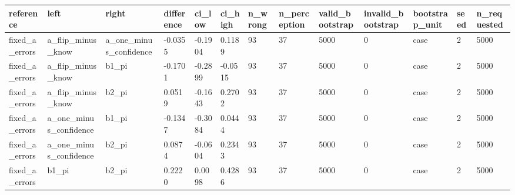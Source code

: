 \begin{tabular}{lllllllllllll}
\hline
reference & left & right & difference & ci\_low & ci\_high & n\_wrong & n\_perception & valid\_bootstrap & invalid\_bootstrap & bootstrap\_unit & seed & n\_requested \\
\hline
fixed\_a\_errors & a\_flip\_minus\_know & a\_one\_minus\_confidence & -0.0355 & -0.1904 & 0.1189 & 93 & 37 & 5000 & 0 & case & 2 & 5000 \\
fixed\_a\_errors & a\_flip\_minus\_know & b1\_pi & -0.1701 & -0.2899 & -0.0515 & 93 & 37 & 5000 & 0 & case & 2 & 5000 \\
fixed\_a\_errors & a\_flip\_minus\_know & b2\_pi & 0.0519 & -0.1643 & 0.2702 & 93 & 37 & 5000 & 0 & case & 2 & 5000 \\
fixed\_a\_errors & a\_one\_minus\_confidence & b1\_pi & -0.1347 & -0.3084 & 0.0444 & 93 & 37 & 5000 & 0 & case & 2 & 5000 \\
fixed\_a\_errors & a\_one\_minus\_confidence & b2\_pi & 0.0874 & -0.0604 & 0.2343 & 93 & 37 & 5000 & 0 & case & 2 & 5000 \\
fixed\_a\_errors & b1\_pi & b2\_pi & 0.2220 & 0.0098 & 0.4286 & 93 & 37 & 5000 & 0 & case & 2 & 5000 \\
\hline
\end{tabular}
